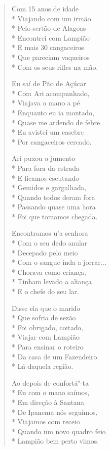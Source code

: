 \begin{verse}
Com 15 anos de idade\\*
Viajando com um irmão\\*
Pelo sertão de Alagoas\\*
Encontrei com Lampião\\*
E mais 30 cangaceiros\\*
Que pareciam vaqueiros\\*
Com os seus rifles na mão.

Eu saí de Pão de Açúcar\\*
Com Ari acompanhado,\\*
Viajava o mano a pé\\*
Enquanto eu ia montado,\\*
Quase me ardendo de febre\\*
Eu avistei um casebre\\*
Por cangaceiros cercado.

Ari puxou o jumento\\*
Para fora da estrada\\*
E ficamos escutando\\*
Gemidos e gargalhada,\\*
Quando todos deram fora\\*
Passando quase uma hora\\*
Foi que tomamos chegada.

Encontramos u'a senhora\\*
Com o seu dedo anular\\*
Decepado pelo meio\\*
Com o sangue inda a jorrar...\\*
Chorava como criança,\\*
Tinham levado a aliança\\*
E o chefe do seu lar.

Disse ela que o marido\\*
Que sofria de sezão\\*
Foi obrigado, coitado,\\*
Viajar com Lampião\\*
Para ensinar o roteiro\\*
Da casa de um Fazendeiro\\*
Lá daquela região.

Ao depois de confortá"-ta\\*
Eu com o mano saímos,\\*
Em direção à Santana\\*
De Ipanema nós seguimos,\\*
Viajamos com receio\\*
Quando um novo quadro feio\\*
Lampião bem perto vimos.


\end{verse}
